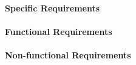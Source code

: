 \paragraph{Specific Requirements}

\paragraph{Functional Requirements}

\paragraph{Non-functional Requirements}
